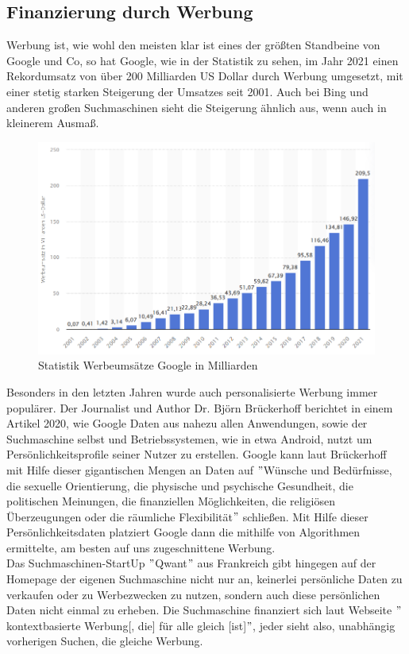 \subsection{Finanzierung durch Werbung}\label{subsec:finanzierung-durch-werbung}
Werbung ist, wie wohl den meisten klar ist eines der größten Standbeine von Google und Co,
so hat Google, wie in der Statistik zu sehen, im Jahr 2021 einen Rekordumsatz von über 200 Milliarden US Dollar durch Werbung umgesetzt,
mit einer stetig starken Steigerung der Umsatzes seit 2001.
Auch bei Bing und anderen großen Suchmaschinen sieht die Steigerung ähnlich aus, wenn auch in kleinerem Ausmaß.
\begin{figure}[h]
    \centering
    \includegraphics[width=120mm]{images/statistic_google_ads}
    \caption{Statistik Werbeumsätze Google in Milliarden}
    \label{fig:statisticAdsGoogle}
\end{figure}
Besonders in den letzten Jahren wurde auch personalisierte Werbung immer populärer.
Der Journalist und Author Dr. Björn Brückerhoff berichtet in einem Artikel 2020,
wie Google Daten aus nahezu allen Anwendungen, sowie der Suchmaschine selbst und Betriebssystemen,
wie in etwa Android, nutzt um Persönlichkeitsprofile seiner Nutzer zu erstellen.
Google kann laut Brückerhoff mit Hilfe dieser gigantischen Mengen an Daten auf \("\)Wünsche und Bedürfnisse,
die sexuelle Orientierung, die physische und psychische Gesundheit, die politischen Meinungen, die finanziellen Möglichkeiten,
die religiösen Überzeugungen oder die räumliche Flexibilität\("\)\cite{BRK20} schließen.
Mit Hilfe dieser Persönlichkeitsdaten platziert Google dann die mithilfe von Algorithmen ermittelte,
am besten auf uns zugeschnittene Werbung.\cite{BRK20}\\

Das Suchmaschinen-StartUp \("\)Qwant\("\) aus Frankreich gibt hingegen auf der Homepage der eigenen Suchmaschine nicht nur an,
keinerlei persönliche Daten zu verkaufen oder zu Werbezwecken zu nutzen, sondern auch diese persönlichen Daten nicht einmal zu erheben.
Die Suchmaschine finanziert sich laut Webseite \("\)kontextbasierte Werbung[, die] für alle gleich [ist]\("\)\cite{QWA22},
jeder sieht also, unabhängig vorherigen Suchen, die gleiche Werbung.

